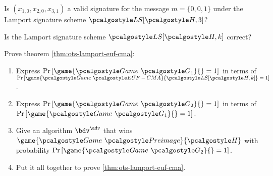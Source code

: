 \begin{exercise}
  Is $(x_{1,0}, x_{2,0}, x_{3,1})$ a valid signature for the message $m = \{0, 0, 1\}$ under the Lamport signature scheme $\algo{LS}[\algo{H, 3}]$?
\end{exercise}

\begin{exercise}
  Is the Lamport signature scheme $\algo{LS}[\algo{H, k}]$ correct?
\end{exercise}

\begin{exercise}
  Prove theorem \autoref{thm:ots-lamport-euf-cma}:
  \begin{enumerate}
      \item Express $\pr{\game{\Game~\algo{G_1}}{} = 1}$ in terms of $\pr{\game{\Game~\algo{EUF-CMA}}{\algo{LS[\algo{H}, k]}} = 1}$.
      \item Express $\pr{\game{\Game~\algo{G_2}}{} = 1}$ in terms of $\pr{\game{\Game~\algo{G_1}}{} = 1}$.
      \item Give an algorithm $\bdv^\adv$ that wins $\game{\Game~\algo{Preimage}}{\algo{H}}$ with probability $\pr{\game{\Game~\algo{G_2}}{} = 1}$.
      \item Put it all together to prove \autoref{thm:ots-lamport-euf-cma}.
  \end{enumerate}
\end{exercise}

